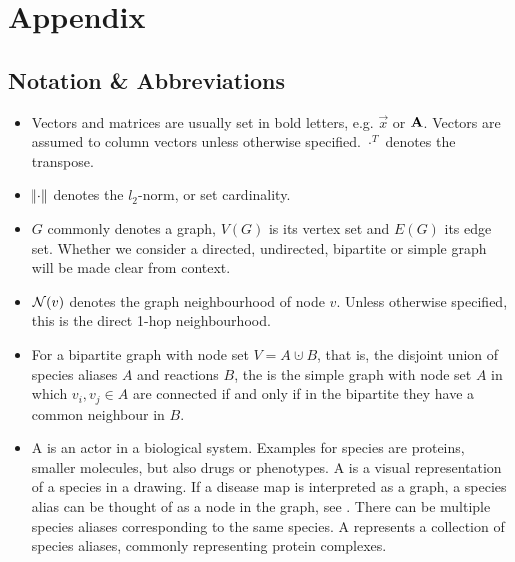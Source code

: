 \documentclass[
	fontsize=10pt, %
	twoside=false, %
	secnumdepth=1, %
  toc=indentunnumbered %
]{kaobook}
\begin{document}










\pagebreak


\backmatter %

\appendix %



\chapter{Appendix}

\section{Notation \& Abbreviations}
\begin{itemize}
\item Vectors and matrices are usually set in bold letters, e.g. $\vec x$ or
  $\mathbf{A}$. Vectors are assumed to column vectors unless otherwise specified.
  $\cdot^T$ denotes the transpose.
\item $\norm{\cdot}$ denotes the $l_2$-norm, or set cardinality.
\item $G$ commonly denotes a graph, $V(G)$ is its vertex set and $E(G)$ its edge
  set. Whether we consider a directed, undirected, bipartite or simple graph
  will be made clear from context.
\item $\mathcal{N}(v)$ denotes the graph neighbourhood of node $v$. Unless otherwise
  specified, this is the direct 1-hop neighbourhood.
\item For a bipartite graph with node set $V = A
  \cupdot B$, that is, the disjoint union of species aliases $A$ and reactions
  $B$, the  is the simple graph with node set
  $A$ in which $v_i, v_j \in A$ are connected if and only if in the bipartite
  they have a common neighbour in $B$.
\item A  is an actor in a biological system. Examples for species
  are proteins, smaller molecules, but also drugs or phenotypes. A  is a visual representation of a species in a drawing. If a disease map
  is interpreted as a graph, a species alias can be thought of as a node in the
  graph, see . There can be multiple species
  aliases corresponding to the same species. A 
  represents a collection of species aliases, commonly representing protein
  complexes.
\end{itemize}
\end{document}

